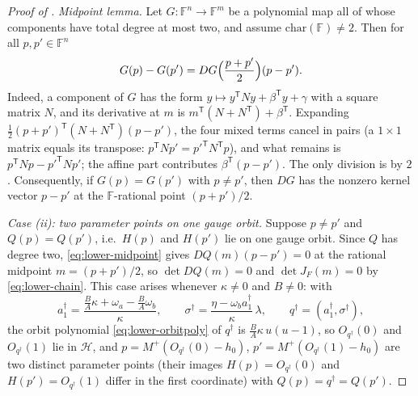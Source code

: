 \begin{proof}[Proof of ]
\smallskip
\noindent\textit{Midpoint lemma.}
Let $G\colon\mathbb{F}^n\to\mathbb{F}^m$ be a polynomial map all of whose components
have total degree at most two, and assume $\mathrm{char}(\mathbb{F})\neq2$.  Then for
all $p,p'\in\mathbb{F}^n$
\begin{equation}
\label{eq:lower-midpoint}
   G(p)-G(p')=DG\Bigl(\frac{p+p'}2\Bigr)(p-p') .
\end{equation}
Indeed, a component of $G$ has the form $y\mapsto y^{\mathsf T}Ny+\beta^{\mathsf T}y+\gamma$
with a square matrix $N$, and its derivative at $m$ is
$m^{\mathsf T}(N+N^{\mathsf T})+\beta^{\mathsf T}$.  Expanding
$\frac12(p+p')^{\mathsf T}(N+N^{\mathsf T})(p-p')$, the four mixed terms cancel in pairs
(a $1\times1$ matrix equals its transpose: $p^{\mathsf T}Np'=p'^{\mathsf T}N^{\mathsf T}p$),
and what remains is $p^{\mathsf T}Np-p'^{\mathsf T}Np'$; the affine part contributes
$\beta^{\mathsf T}(p-p')$.  The only division is by $2$.  Consequently, if $G(p)=G(p')$
with $p\neq p'$, then $DG$ has the nonzero kernel vector $p-p'$ at the
$\mathbb{F}$-rational point $(p+p')/2$.

\smallskip
\noindent\textit{Case (ii): two parameter points on one gauge orbit.}
Suppose $p\neq p'$ and $Q(p)=Q(p')$, i.e.\ $H(p)$ and $H(p')$ lie on one gauge orbit.
Since $Q$ has degree two, \eqref{eq:lower-midpoint} gives $DQ(m)(p-p')=0$ at the
rational midpoint $m=(p+p')/2$, so $\det DQ(m)=0$ and $\det J_F(m)=0$ by
\eqref{eq:lower-chain}.  This case arises whenever $\kappa\neq0$ and $B\neq0$: with
\[
   a_1^\dagger=\frac{\frac BA\kappa+\omega_a-\frac BA\omega_b}{\kappa},\qquad
   \sigma^\dagger=\frac{\eta-\omega_ba_1^\dagger}{\kappa}\,\lambda,\qquad
   q^\dagger=(a_1^\dagger,\sigma^\dagger),
\]
the orbit polynomial \eqref{eq:lower-orbitpoly} of $q^\dagger$ is
$\frac BA\kappa\,u(u-1)$, so $O_{q^\dagger}(0)$ and $O_{q^\dagger}(1)$ lie in
$\mathcal H$, and $p=M^+(O_{q^\dagger}(0)-h_0)$, $p'=M^+(O_{q^\dagger}(1)-h_0)$ are two
distinct parameter points (their images $H(p)=O_{q^\dagger}(0)$ and
$H(p')=O_{q^\dagger}(1)$ differ in the first coordinate) with $Q(p)=q^\dagger=Q(p')$.


\end{proof}
